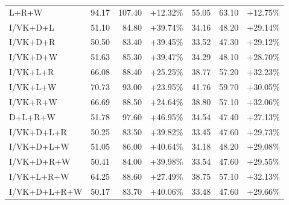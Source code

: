 \documentclass[UTF8,10pt]{ctexart}
\newcommand{\better}[1]{\textcolor{goodblue}{#1}}
\begin{document}
{\begin{longtable}{lrrrrrr}
L+R+W & 94.17 & 107.40 & \better{+12.32\%} & 55.05 & 63.10 & \better{+12.75\%}\\
I/VK+D+L & 51.10 & 84.80 & \better{+39.74\%} & 34.16 & 48.20 & \better{+29.14\%}\\
I/VK+D+R & 50.50 & 83.40 & \better{+39.45\%} & 33.52 & 47.30 & \better{+29.12\%}\\
I/VK+D+W & 51.63 & 85.30 & \better{+39.47\%} & 34.29 & 48.10 & \better{+28.70\%}\\
I/VK+L+R & 66.08 & 88.40 & \better{+25.25\%} & 38.77 & 57.20 & \better{+32.23\%}\\
I/VK+L+W & 70.73 & 93.00 & \better{+23.95\%} & 41.76 & 59.70 & \better{+30.05\%}\\
I/VK+R+W & 66.69 & 88.50 & \better{+24.64\%} & 38.80 & 57.10 & \better{+32.06\%}\\
D+L+R+W & 51.78 & 97.60 & \better{+46.95\%} & 34.54 & 47.40 & \better{+27.13\%}\\
I/VK+D+L+R & 50.25 & 83.50 & \better{+39.82\%} & 33.45 & 47.60 & \better{+29.73\%}\\
I/VK+D+L+W & 51.05 & 86.00 & \better{+40.64\%} & 34.18 & 48.20 & \better{+29.08\%}\\
I/VK+D+R+W & 50.41 & 84.00 & \better{+39.98\%} & 33.54 & 47.60 & \better{+29.55\%}\\
I/VK+L+R+W & 64.25 & 88.60 & \better{+27.49\%} & 38.75 & 57.10 & \better{+32.13\%}\\
I/VK+D+L+R+W & 50.17 & 83.70 & \better{+40.06\%} & 33.48 & 47.60 & \better{+29.66\%}\\
\bottomrule
\end{longtable}
}
\end{document}
